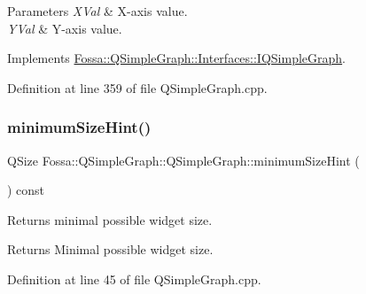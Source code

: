 \begin{DoxyParams}{Parameters}
{\em X\+Val} & X-\/axis value. \\
\hline
{\em Y\+Val} & Y-\/axis value. \\
\hline
\end{DoxyParams}


Implements \hyperlink{class_fossa_1_1_q_simple_graph_1_1_interfaces_1_1_i_q_simple_graph_a5d43e4e0f06bedb1734e4240070fe229}{Fossa\+::\+Q\+Simple\+Graph\+::\+Interfaces\+::\+I\+Q\+Simple\+Graph}.



Definition at line 359 of file Q\+Simple\+Graph.\+cpp.

\mbox{\label{class_fossa_1_1_q_simple_graph_1_1_q_simple_graph_a2b427ee7fc54efd87a33d0a23bbdd1f8}} 
\subsubsection{\texorpdfstring{minimum\+Size\+Hint()}{minimumSizeHint()}}
{\footnotesize\ttfamily Q\+Size Fossa\+::\+Q\+Simple\+Graph\+::\+Q\+Simple\+Graph\+::minimum\+Size\+Hint (\begin{DoxyParamCaption}{ }\end{DoxyParamCaption}) const}



Returns minimal possible widget size. 

\begin{DoxyReturn}{Returns}
Minimal possible widget size. 
\end{DoxyReturn}


Definition at line 45 of file Q\+Simple\+Graph.\+cpp.

\mbox{\label{class_fossa_1_1_q_simple_graph_1_1_q_simple_graph_a7ae9773902324fc533f0b18294f7c516}} 
